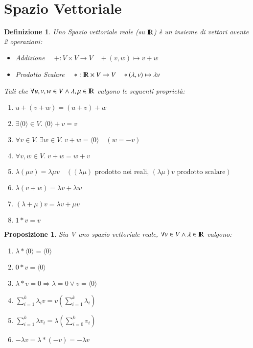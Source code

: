 \documentclass[12pt,a4paper]{article}
\theoremstyle{break}
\newtheorem{definition}{Definizione}[subsection]
\newtheorem{proposition}{Proposizione}[subsection]
\newcommand\R{{\rm I\!R}}
\begin{document}
    \section{Spazio Vettoriale}
    \begin{definition}
        Uno Spazio vettoriale reale (su $\R$) è un insieme di vettori avente 2 operazioni:
        \begin{itemize}
            \item Addizione $\quad+:V\times V \rightarrow V \quad +(v,w)\mapsto v+w$
            \item Prodotto Scalare $\quad *: \R\times V \rightarrow V\quad *(\lambda, v)\mapsto \lambda v$
        \end{itemize}
        Tali che $\forall u,v,w \in V \wedge \lambda,\mu \in \R$ valgono le seguenti proprietà:
        \begin{enumerate}
            \item $u + (v+w) = (u+v)+w$
            \item $\exists \langle 0 \rangle \in V.\; \langle 0 \rangle + v = v$
            \item $\forall v\in V.\;\exists w\in V.\; v+w = \langle 0 \rangle\quad (w= -v)$
            \item $\forall v,w \in V.\; v+w = w+v$
            \item $\lambda(\mu v)  = \lambda\mu v \quad ((\lambda\mu) \text{ prodotto nei reali, } (\lambda\mu)v \text{ prodotto scalare})$
            \item $\lambda(v+w)  = \lambda v + \lambda w$
            \item $(\lambda + \mu)v = \lambda v + \mu v$
            \item $1*v = v$
        \end{enumerate}
    \end{definition}
    \begin{proposition}
        Sia V uno spazio vettoriale reale, $\forall v\in V \wedge \lambda \in \R$ valgono:
        \begin{enumerate}
            \item $\lambda * \langle 0 \rangle = \langle 0 \rangle$
            \item $0 * v = \langle 0 \rangle$
            \item $\lambda * v = 0 \Rightarrow \lambda = 0 \vee v = \langle 0 \rangle$
            \item $\sum_{i=1}^k \lambda_i v = v\left(\sum_{i=1}^k \lambda_i\right)$
            \item $\sum_{i=1}^k \lambda v_i = \lambda\left(\sum_{i=0}^k v_i\right)$
            \item $-\lambda v = \lambda * (-v) = -\lambda v$
        \end{enumerate}
    \end{proposition}
\end{document}
